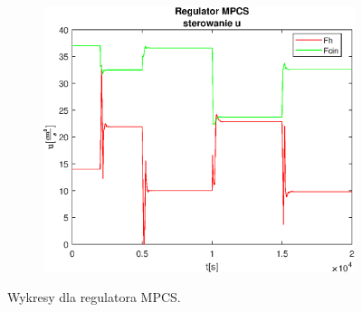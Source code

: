 \begin{figure}[h!]
   \begin{subfigure}[b]{0.4\textwidth}
      \includegraphics[width=1\linewidth]{img/MPCSanaRK/MPCSRKControlN300Nu100l10.eps}
      \caption{}
      \label{fig:fig:MPCSRKN300Nu100l103}
   \end{subfigure}
       
   \caption{Wykresy dla regulatora MPCS.}
   \label{fig:MPCSRKN300Nu100l10}
\end{figure}
           
